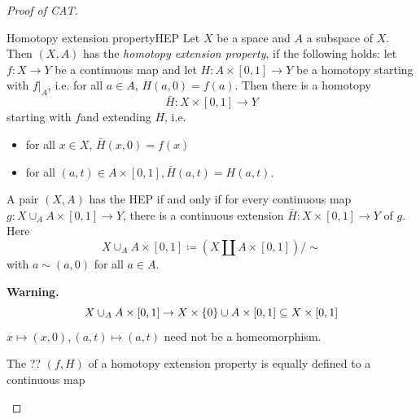 \documentclass{TemplateLecture}
\begin{document}
\begin{proof}[Proof of CAT]
    \begin{defi}{Homotopy extension property}{HEP}
        Let \(X\) be a space and \(A\) a subspace of \(X\). Then \((X,A)\) has the \emph{homotopy extension property}, if the following holds: let \(f\colon X\to Y\) be a continuous map and let \(H\colon A\times [0,1] \to Y\) be a homotopy starting with \(f\rvert_A\), i.e. for all \(a \in A\), \(H(a,0) = f(a)\). Then there is a homotopy
        \[\bar H \colon X \times [0,1] \to Y\]
        starting with \(f\)and extending \(H\), i.e.
        \begin{itemize}
            \item for all \(x \in X\), \(\bar H(x,0) = f(x)\)
            \item for all \((a,t) \in A\times [0,1], \bar H(a,t) = H(a,t)\).
        \end{itemize}
    \end{defi}

    \begin{lem}{}{}
        A pair \((X,A)\) has the HEP if and only if for every continuous map \(g\colon X\cup_A A \times [0,1] \to Y\), there is a continuous extension \(\bar H\colon X\times [0,1] \to Y\) of \(g\). Here
        \[X \cup_A A \times [0,1] \coloneq (X\amalg A \times [0,1])/\sim\]
        with \(a \sim (a,0)\) for all \(a \in A\).
    \end{lem}

    \textbf{Warning.}
    \[X\cup_A A\times [0,1] \to X \times \{0\} \cup A \times [0,1] \subseteq X \times [0,1]\] \(x \mapsto (x,0), (a,t) \mapsto (a,t)\)
        need not be a homeomorphism.

    \begin{proposition}
        The  ?? \((f, H)\) of a homotopy extension property is equally defined to a continuous map
        \[\]%


\end{proposition}
\end{proof}
\end{document}

